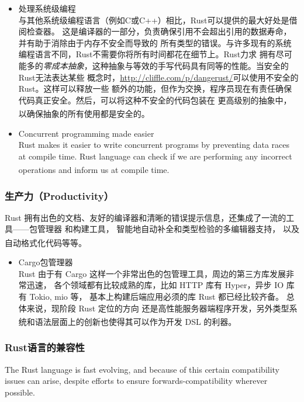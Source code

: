 \documentclass[UTF8,fontset=none,linespread=1.15]{ctexart}
\let\nosupcite\cite
\renewcommand*{\cite}[1]{\textsuperscript{\nosupcite{#1}}}
\begin{document}
\begin{itemize}
\item 处理系统级编程\\
  与其他系统级编程语言（例如C或C++）相比，Rust可以提供的最大好处是借阅检查器。
  这是编译器的一部分，负责确保引用不会超出引用的数据寿命，并有助于消除由于内存不安全而导致的
  所有类型的错误。与许多现有的系统编程语言不同，Rust不需要你将所有时间都花在细节上。Rust力求
  拥有尽可能多的\textit{零成本抽象}，这种抽象与等效的手写代码具有同等的性能。当安全的Rust无法表达某些
  概念时，\url{http://cliffle.com/p/dangerust/}可以使用不安全的 Rust。这样可以释放一些
  额外的功能，但作为交换，程序员现在有责任确保代码真正安全。然后，可以将这种不安全的代码包装在
  更高级别的抽象中，以确保抽象的所有使用都是安全的。\cite{bib:3-why-rust-pop}

\item Concurrent programming made easier\\
  Rust makes it easier to write concurrent programs by preventing data races at
  compile time. Rust language can
  check if we are performing any incorrect operations and inform
  us at compile time.\cite{bib:6-why-rust-pop-2}
\end{itemize}

\subsubsection{生产力（Productivity）}

Rust 拥有出色的文档、友好的编译器和清晰的错误提示信息，还集成了一流的工具——包管理器
和构建工具， 智能地自动补全和类型检验的多编辑器支持， 以及自动格式化代码等等。\cite{bib:1-rust-lang}

\begin{itemize}
\item Cargo包管理器\\
  Rust 由于有 Cargo 这样一个非常出色的包管理工具，周边的第三方库发展非常迅速，
  各个领域都有比较成熟的库，比如 HTTP 库有 Hyper，异步 IO 库有 Tokio, mio 等，
  基本上构建后端应用必须的库 Rust 都已经比较齐备。 总体来说，现阶段 Rust 定位的方向
  还是高性能服务器端程序开发，另外类型系统和语法层面上的创新也使得其可以作为开发 DSL
  的利器。\cite{bib:2-why-rust}\\
\end{itemize}
\subsubsection{Rust语言的兼容性}

The Rust language is fast evolving, and because of this certain compatibility
issues can arise, despite efforts to ensure forwards-compatibility wherever possible.
\end{document}
